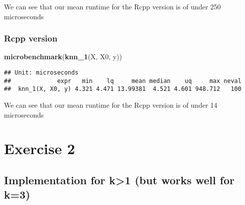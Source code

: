 \documentclass[]{article}
\newenvironment{Shaded}{\begin{snugshade}}{\end{snugshade}}
\newcommand{\KeywordTok}[1]{\textcolor[rgb]{0.13,0.29,0.53}{\textbf{#1}}}
\newcommand{\NormalTok}[1]{#1}
\begin{document}
We can see that our mean runtime for the Rcpp version is of under 250
microseconds

\hypertarget{rcpp-version}{%
\subsubsection{Rcpp version}\label{rcpp-version}}

\begin{Shaded}
\begin{Highlighting}[]
\KeywordTok{microbenchmark}\NormalTok{(}\KeywordTok{knn_1}\NormalTok{(X, X0, y))}
\end{Highlighting}
\end{Shaded}

\begin{verbatim}
## Unit: microseconds
##             expr   min    lq     mean median    uq     max neval
##  knn_1(X, X0, y) 4.321 4.471 13.99381  4.521 4.601 948.712   100
\end{verbatim}

We can see that our mean runtime for the Rcpp version is of under 14
microseconds

\newpage

\hypertarget{exercise-2}{%
\section{Exercise 2}\label{exercise-2}}

\hypertarget{implementation-for-k1-but-works-well-for-k3}{%
\subsection{Implementation for k\textgreater{}1 (but works well for
k=3)}\label{implementation-for-k1-but-works-well-for-k3}}
\end{document}
